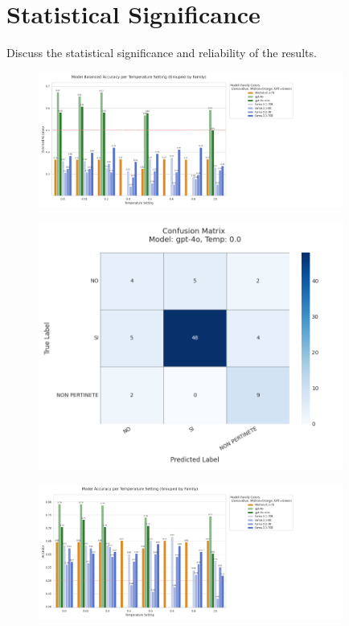 \documentclass[../main.tex]{subfiles}
\begin{document}
\section*{Statistical Significance}
Discuss the statistical significance and reliability of the results.
\begin{figure}[H]
    \includegraphics[width=10cm]{Graphs/Balanced Accuracy.png}
\end{figure}
\begin{figure}[H]
    \includegraphics[width=10cm]{Graphs/Confusion Matrix GPT 4o.png}
\end{figure}
\begin{figure}[H]
    \includegraphics[width=10cm]{Graphs/Model Accuracy final.png}
\end{figure}
\end{document}
